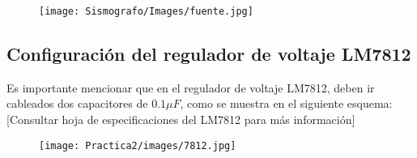 \documentclass[12pt]{article}
\begin{document}
	        \begin{figure}[h!]
                \centering
                \texttt{[image: Sismografo/Images/fuente.jpg]}
            \end{figure} 
        \subsection{Configuración del regulador de voltaje LM7812}
        Es importante mencionar que en el regulador de voltaje LM7812, deben ir cableados dos capacitores de $0.1\mu F$, como se muestra en el siguiente esquema: [Consultar hoja de especificaciones del LM7812 para más información]
        
        \begin{figure}[h!]
                \centering
                \texttt{[image: Practica2/images/7812.jpg]}
            \end{figure}
        

	\nocite{ref1, ref2, ref3, ref4}
	
        

	
\end{document}

